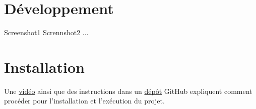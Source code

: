 \documentclass{article}
\begin{document}
\section{Développement}

Screenshot1
Scrennshot2
...

\section{Installation}
Une \href{file:./promenade_projet_ift_2935_groupe_20.mp4}{vidéo} ainsi que des instructions dans un \href{https://github.com/OlivierLarueUmontreal/ProjetIFT2935}{dépôt} GitHub expliquent comment procéder pour l'installation et l'exécution du projet.
\end{document}
